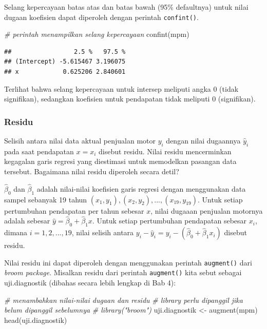 \documentclass[
]{book}
\newenvironment{Shaded}{\begin{snugshade}}{\end{snugshade}}
\newcommand{\CommentTok}[1]{\textcolor[rgb]{0.56,0.35,0.01}{\textit{#1}}}
\newcommand{\FunctionTok}[1]{\textcolor[rgb]{0.00,0.00,0.00}{#1}}
\newcommand{\NormalTok}[1]{#1}
\newcommand{\OtherTok}[1]{\textcolor[rgb]{0.56,0.35,0.01}{#1}}
\begin{document}
Selang kepercayaan batas atas dan batas bawah (95\% defaultnya) untuk nilai dugaan koefisien dapat diperoleh dengan perintah \texttt{confint()}.

\begin{Shaded}
\begin{Highlighting}[]
\CommentTok{\# perintah menampilkan selang kepercayaan}
\FunctionTok{confint}\NormalTok{(mpm)}
\end{Highlighting}
\end{Shaded}

\begin{verbatim}
##                 2.5 %   97.5 %
## (Intercept) -5.615467 3.196075
## x            0.625206 2.840601
\end{verbatim}

Terlihat bahwa selang kepercayaan untuk intersep meliputi angka 0 (tidak signifikan), sedangkan koefisien untuk pendapatan tidak meliputi 0 (signifikan).

\hypertarget{residu}{%
\subsubsection{Residu}\label{residu}}

Selisih antara nilai data aktual penjualan motor \(y_i\) dengan nilai dugaannya \(\hat y_i\) pada saat pendapatan \(x = x_i\) disebut residu. Nilai residu mencerminkan kegagalan garis regresi yang diestimasi untuk memodelkan pasangan data tersebut. Bagaimana nilai residu diperoleh secara detil?

\(\hat \beta_0\) dan \(\hat \beta_1\) adalah nilai-nilai koefisien garis regresi dengan menggunakan data sampel sebanyak 19 tahun \((x_1, y_1),(x_2, y_2), . . . , (x_{19}, y_{19})\). Untuk setiap pertumbuhan pendapatan per tahun sebesar \(x\), nilai dugaaan penjualan motornya adalah sebesar \(\hat y = \hat \beta_0 + \hat \beta_1x\). Untuk setiap pertumbuhan pendapatan sebesar \(x_i\), dimana \(i = 1, 2, . . . , 19\), nilai selisih antara \(y_i−\hat y_i = y_i − (\hat \beta_0 + \hat \beta_1x_i)\) disebut residu.

Nilai residu ini dapat diperoleh dengan menggunakan perintah \texttt{augment()} dari \emph{broom package}. Misalkan residu dari perintah \texttt{augment()} kita sebut sebagai uji.diagnostik (dibahas secara lebih lengkap di Bab 4):

\begin{Shaded}
\begin{Highlighting}[]
\CommentTok{\# menambahkan nilai{-}nilai dugaan dan residu}
\CommentTok{\# library perlu dipanggil jika belum dipanggil sebelumnya}
\CommentTok{\# library("broom") }
\NormalTok{uji.diagnostik }\OtherTok{\textless{}{-}} \FunctionTok{augment}\NormalTok{(mpm)}
\FunctionTok{head}\NormalTok{(uji.diagnostik)}
\end{Highlighting}
\end{Shaded}
\end{document}
